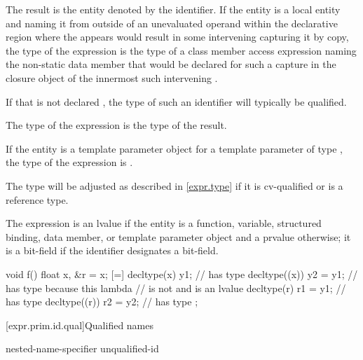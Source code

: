 \pnum
The result is the entity denoted by the identifier.
If the entity is a local entity
and naming it from outside of an unevaluated operand
within the declarative region where the  appears
would result in some intervening 
capturing it by copy,
the type of the expression is
the type of a class member access expression
naming the non-static data member
that would be declared for such a capture
in the closure object of
the innermost such intervening .
\begin{note}
If that  is not declared ,
the type of such an identifier will typically be  qualified.
\end{note}
The type of the expression is the type of the result.
\begin{note}
If the entity is a template parameter object for
a template parameter of type ,
the type of the expression is .
\end{note}
\begin{note}
The type will be adjusted as described in \ref{expr.type}
if it is cv-qualified or is a reference type.
\end{note}
The expression is an lvalue
if the entity is a function, variable, structured binding, data member, or
template parameter object
and a prvalue otherwise;
it is a bit-field if the identifier designates a bit-field.
\begin{example}
\begin{codeblock}
void f() {
  float x, &r = x;
  [=] {
    decltype(x) y1;             //  has type 
    decltype((x)) y2 = y1;      //  has type  because this lambda
                                // is not  and  is an lvalue
    decltype(r) r1 = y1;        //  has type 
    decltype((r)) r2 = y2;      //  has type 
  };
}
\end{codeblock}
\end{example}

[expr.prim.id.qual]{Qualified names}

%
%
%
\begin{bnf}
\br
    nested-name-specifier  unqualified-id
\end{bnf}

